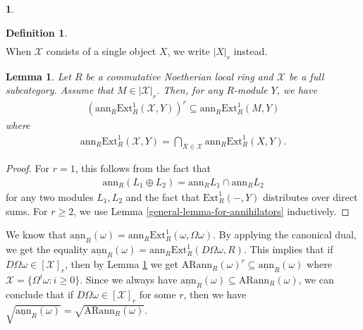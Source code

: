\documentclass[12pt]{amsart}
\newcommand{\Ext}{\mathrm{Ext}}
\newcommand{\ann}{\mathrm{ann}}
\newcommand{\sann}{\underline{\mathrm{ann}}}
\newcommand{\arann}{\mathrm{ARann}}
\newcommand{\XX}{\mathcal{X}}
\newtheorem{lemma}[theorem]{Lemma}
\theoremstyle{definition}
\newtheorem{definition}[theorem]{Definition}
\newtheorem{chunk}[theorem]{}
\numberwithin{equation}{theorem}
\begin{document}
\begin{chunk}
\begin{definition}
\begin{align*}
        \end{align*}
        When $\XX$ consists of a single object $X$, we write $|X|_r$ instead.
    \end{definition}
    \begin{lemma}\label{lemma-for-annihilators-from-balls}
        Let $R$ be a commutative Noetherian local ring and $\XX$ be a full subcategory. Assume that $M \in |\XX|_r$. Then, for any $R$-module $Y$, we have
        \begin{align*}
            (\ann_R\Ext_R^1(\XX,Y))^r \subseteq \ann_R\Ext_R^1(M,Y) 
        \end{align*}
        where
        \begin{align*}
            \ann_R\Ext_R^1(\XX,Y) = \bigcap_{X \in \XX} \ann_R\Ext_R^1(X,Y).
        \end{align*}
    \end{lemma}
    \begin{proof}
        For $r=1$, this follows from the fact that
        \begin{align*}
            \ann_R(L_1\oplus L_2) = \ann_R L_1 \cap \ann_R L_2
        \end{align*}
        for any two modules $L_1,L_2$ and the fact that $\Ext_R^1(-,Y)$ distributes over direct sums. For $r \geq 2$, we use Lemma \ref{general-lemma-for-annihilators} inductively.
    \end{proof}
    
    
        We know that $\sann_R(\omega) = \ann_R\Ext_R^1(\omega, \Omega \omega)$. By applying the canonical dual, we get the equality $\sann_R(\omega) = \ann_R\Ext_R^1(D\Omega \omega, R)$. This implies that if $D\Omega \omega \in [\XX]_r $, then by Lemma \ref{lemma-for-annihilators-from-balls} we get $\arann_R(\omega)^r \subseteq \sann_R(\omega)$ where $\XX= \{ \Omega^i \omega \colon i \geq 0 \}$. Since we always have $\sann_R(\omega) \subseteq \arann_R(\omega)$, we can conclude that if $D\Omega \omega \in [\XX]_r $ for some $r$, then we have $\sqrt{\sann_R(\omega)} = \sqrt{\arann_R(\omega)}$.
    

\end{chunk}
\end{document}
